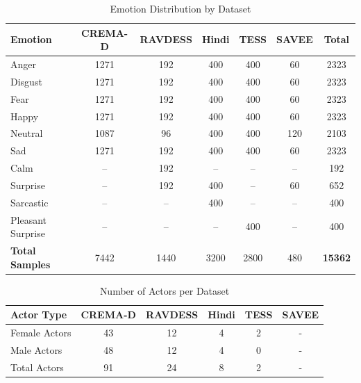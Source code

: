\documentclass[iicol,sn-mathphys-num]{sn-jnl}%
\theoremstyle{thmstyleone}%
\theoremstyle{thmstyletwo}%
\theoremstyle{thmstylethree}%
\begin{document}
\begin{table}[h]
\caption{Emotion Distribution by Dataset}\label{tab:emotion_distribution}%
\centering
\small
\begin{tabular}{@{}l|ccccc|c@{}}
\toprule
\textbf{Emotion} & \textbf{CREMA-D} & \textbf{RAVDESS} & \textbf{Hindi} & \textbf{TESS} & \textbf{SAVEE} & \textbf{Total} \\
\midrule
Anger & 1271 & 192 & 400 & 400 & 60 & 2323 \\
Disgust & 1271 & 192 & 400 & 400 & 60 & 2323 \\
Fear & 1271 & 192 & 400 & 400 & 60 & 2323 \\
Happy & 1271 & 192 & 400 & 400 & 60 & 2323 \\
Neutral & 1087 & 96 & 400 & 400 & 120 & 2103 \\
Sad & 1271 & 192 & 400 & 400 & 60 & 2323 \\
Calm & -- & 192 & -- & -- & -- & 192 \\
Surprise & -- & 192 & 400 & -- & 60 & 652 \\
Sarcastic & -- & -- & 400 & -- & -- & 400 \\
Pleasant Surprise & -- & -- & -- & 400 & -- & 400 \\
\midrule
\textbf{Total Samples} & 7442 & 1440 & 3200 & 2800 & 480 & \textbf{15362} \\
\bottomrule
\end{tabular}
\end{table}

\begin{table}[h]
\caption{Number of Actors per Dataset}\label{tab:actors_per_dataset}%
\centering
\small
\begin{tabular}{@{}l|ccccc@{}}
\toprule
\textbf{Actor Type} & \textbf{CREMA-D} & \textbf{RAVDESS} & \textbf{Hindi} & \textbf{TESS} & \textbf{SAVEE} \\
\midrule
Female Actors & 43 & 12 & 4 & 2 & - \\
Male Actors & 48 & 12 & 4 & 0 & - \\
\midrule
Total Actors & 91 & 24 & 8 & 2 & - \\
\bottomrule
\end{tabular}
\end{table}
\end{document}
